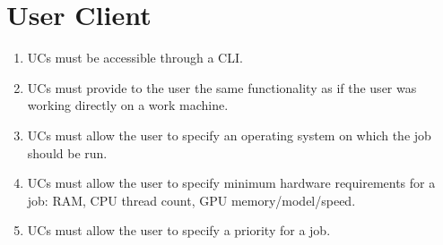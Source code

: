 \section{User Client}
\begin{enumerate}
 \item UCs must be accessible through a CLI.
 \item UCs must provide to the user the same functionality as if the user was working directly on a work machine.
 \item UCs must allow the user to specify an operating system on which the job should be run.
 \item UCs must allow the user to specify minimum hardware requirements for a job: RAM, CPU thread count, GPU memory/model/speed.
 \item UCs must allow the user to specify a priority for a job.
\end{enumerate}

